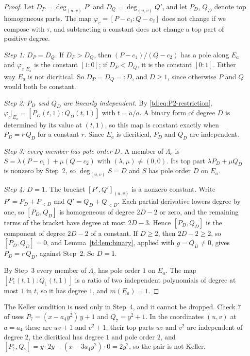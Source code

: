 \documentclass[a4paper,11pt]{article}
\newcommand{\filename}[1]{\texttt{\seqsplit{#1}}}
\theoremstyle{jsplain}
\theoremstyle{jsdef}
\theoremstyle{jsrem}
\begin{document}
\begin{proof}
Let $D_P = \deg_{(u,v)} P'$ and $D_Q = \deg_{(u,v)} Q'$, and let $P_D$, $Q_D$ denote top
homogeneous parts. The map $\varphi_c = [P - c_1 : Q - c_2]$ does not change if we compose with
$\tau$, and subtracting a constant does not change a top part of positive degree.

\emph{Step 1: $D_P = D_Q$.} If $D_P > D_Q$, then $(P - c_1)/(Q - c_2)$ has a pole along $E_a$ and
$\varphi_c|_{E_a}$ is the constant $[1:0]$; if $D_P < D_Q$, it is the constant $[0:1]$. Either way
$E_a$ is not dicritical. So $D_P = D_Q =: D$, and $D \geq 1$, since otherwise $P$ and $Q$ would
both be constant.

\emph{Step 2: $P_D$ and $Q_D$ are linearly independent.} By \eqref{td:eq:P2-restriction},
$\varphi_c|_{E_a} = [P_D(t,1) : Q_D(t,1)]$ with $t = \tilde a/a$. A binary form of degree $D$ is
determined by its value at $(t,1)$, so this map is constant exactly when $P_D = r\, Q_D$ for a
constant $r$. Since $E_a$ is dicritical, $P_D$ and $Q_D$ are independent.

\emph{Step 3: every member has pole order $D$.} A member of $\Lambda_c$ is
$S = \lambda (P - c_1) + \mu (Q - c_2)$ with $(\lambda, \mu) \neq (0,0)$. Its top part
$\lambda P_D + \mu Q_D$ is nonzero by Step~2, so $\deg_{(u,v)} S = D$ and $S$ has pole order $D$
on $E_a$.

\emph{Step 4: $D = 1$.} The bracket $[P', Q']_{(u,v)}$ is a nonzero constant. Write
$P' = P_D + P_{<D}$ and $Q' = Q_D + Q_{<D}$. Each partial derivative lowers degree by one, so
$[P_D, Q_D]$ is homogeneous of degree $2D - 2$ or zero, and the remaining terms of the bracket
have degree at most $2D - 3$. Hence $[P_D, Q_D]$ is the component of degree $2D - 2$ of a constant.
If $D \geq 2$, then $2D - 2 \geq 2$, so $[P_D, Q_D] = 0$, and Lemma~\ref{td:lem:binary}, applied
with $g = Q_D \neq 0$, gives $P_D = r\, Q_D$, against Step~2. So $D = 1$.

By Step~3 every member of $\Lambda_c$ has pole order $1$ on $E_a$. The map
$[P_1(t,1) : Q_1(t,1)]$ is a ratio of two independent polynomials of degree at most $1$ in $t$,
so it has degree $1$, and $m(E_a) = 1$.
\end{proof}

The Keller condition is used only in Step~4, and it cannot be dropped. Check $7$ of
\filename{lean/check\_satellite.py} uses $P_7 = (x - a_4 y^2)\, y + 1$ and $Q_7 = y^2 + 1$. In the
coordinates $(u,v)$ at $a = a_4$ these are $uv + 1$ and $v^2 + 1$: their top parts $uv$ and $v^2$
are independent of degree $2$, the dicritical has degree $1$ and pole order $2$, and
$[P_7, Q_7] = y \cdot 2y - (x - 3a_4 y^2) \cdot 0 = 2y^2$, so the pair is not Keller.
\end{document}
